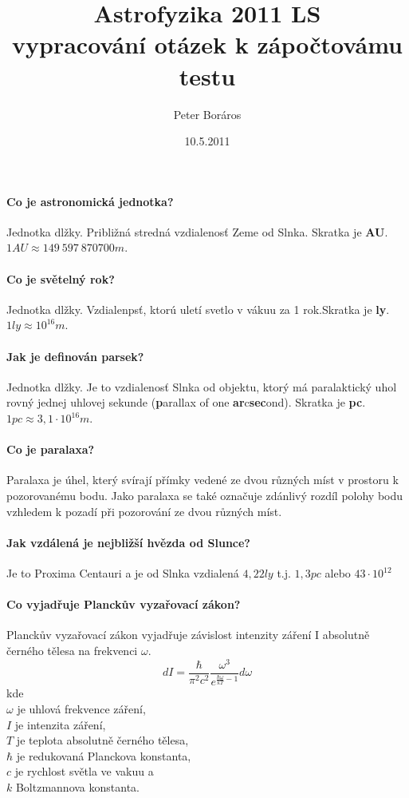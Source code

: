 \documentclass[11pt,a4paper,notitlepage]{article}
\begin{document}
\title{\textbf{Astrofyzika 2011 LS}\\vypracování otázek k zápočtovámu testu}
\author{Peter Boráros}
\date{10.5.2011}

\maketitle

\paragraph{Co je astronomická jednotka?}
Jednotka dlžky. Približná stredná vzdialenosť Zeme od Slnka. Skratka je \textbf{AU}.
 $ 1AU \approx 149~597~870 700 m. $
\paragraph{Co je světelný rok? }
Jednotka dlžky. Vzdialenpsť, ktorú uletí svetlo v vákuu za 1 rok.Skratka je \textbf{ly}.
$ 1ly \approx 10^{16} m $.
\paragraph{Jak je definován parsek?}
Jednotka dlžky. Je to vzdialenosť Slnka od objektu, ktorý má paralaktický uhol rovný
jednej uhlovej sekunde (\textbf{p}arallax of one \textbf{ar}c\textbf{sec}ond). 
Skratka je \textbf{pc}.
$ 1pc \approx 3,1\cdot 10^{16} m $.
\paragraph{Co je paralaxa?}
Paralaxa je úhel, který svírají přímky vedené ze dvou různých míst v prostoru k pozorovanému
bodu. Jako paralaxa se také označuje zdánlivý rozdíl polohy bodu vzhledem k pozadí při
pozorování ze dvou různých míst.
\paragraph{Jak vzdálená je nejbližší hvězda od Slunce?}
Je to Proxima Centauri a je od Slnka vzdialená $ 4,22ly $ t.j. $ 1,3pc $ 
alebo $ 43\cdot10^{12} $
\paragraph{Co vyjadřuje Planckův vyzařovací zákon?}
Planckův vyzařovací zákon vyjadřuje závislost intenzity záření I absolutně černého 
tělesa na frekvenci $ \omega $.
\[  dI = \frac{\hbar}{\pi^2c^2} \frac{\omega^3}{e^{\frac{\hbar \omega}{kT}-1}}d\omega  \]
kde\\
$ \omega $ je uhlová frekvence záření,\\
$ I $ je intenzita záření,\\
$ T $ je teplota absolutně černého tělesa,\\
$ \hbar $ je redukovaná Planckova konstanta,\\
$ c $ je rychlost světla ve vakuu a\\
$ k $ Boltzmannova konstanta.
\end{document}
